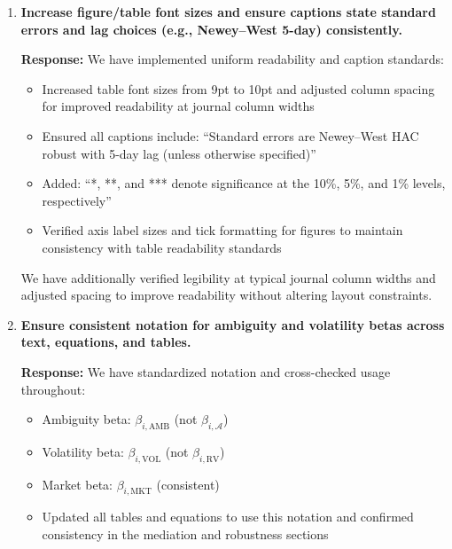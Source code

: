\documentclass[12pt]{article}
\begin{document}
\begin{enumerate}
\begin{responsebox}
    \vspace{0.5cm}
    We have standardized frequency annotations (daily vs monthly) and units (percentage points vs index units) across all tables. Where transformations are applied (e.g., log returns aggregated intraday, first differences for shocks), captions explicitly note the transformation to avoid ambiguity. Robustness panels that use alternative measures include an additional note clarifying the specific variant (e.g., alternative volatility proxy or entropy weighting).
    \end{responsebox}

    \item \textbf{Increase figure/table font sizes and ensure captions state standard errors and lag choices (e.g., Newey--West 5-day) consistently.}

    \begin{responsebox}
    \vspace{0.5cm}
    \textbf{Response:} We have implemented uniform readability and caption standards:
    \begin{itemize}
        \item Increased table font sizes from 9pt to 10pt and adjusted column spacing for improved readability at journal column widths
        \item Ensured all captions include: ``Standard errors are Newey–West HAC robust with 5-day lag (unless otherwise specified)''
        \item Added: ``*, **, and *** denote significance at the 10\%, 5\%, and 1\% levels, respectively''
        \item Verified axis label sizes and tick formatting for figures to maintain consistency with table readability standards
    \end{itemize}
    
    \vspace{0.5cm}
    We have additionally verified legibility at typical journal column widths and adjusted spacing to improve readability without altering layout constraints.
    \end{responsebox}

    \item \textbf{Ensure consistent notation for ambiguity and volatility betas across text, equations, and tables.}

    \begin{responsebox}
    \vspace{0.5cm}
    \textbf{Response:} We have standardized notation and cross-checked usage throughout:
    \begin{itemize}
        \item Ambiguity beta: $\beta_{i,\text{AMB}}$ (not $\beta_{i,\mathcal{A}}$)
        \item Volatility beta: $\beta_{i,\text{VOL}}$ (not $\beta_{i,\text{RV}}$)
        \item Market beta: $\beta_{i,\text{MKT}}$ (consistent)
        \item Updated all tables and equations to use this notation and confirmed consistency in the mediation and robustness sections
    \end{itemize}
    

\end{responsebox}
\end{enumerate}
\end{document}
